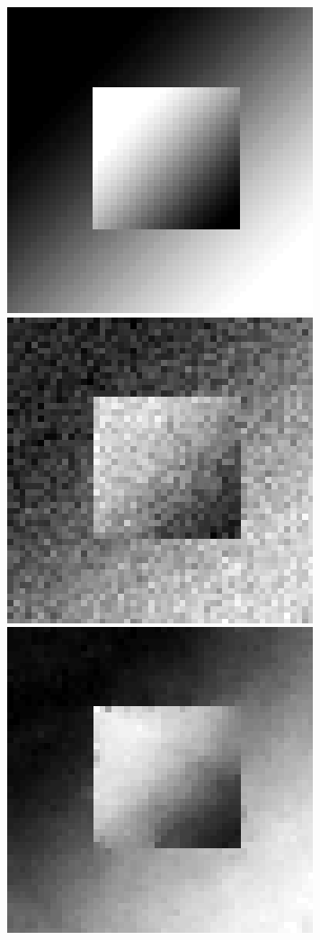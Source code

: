 \begin{figure}[!h]
\center
\includegraphics[scale=.28]{figures/epbp/denoisingExpleORIG}
\hspace*{.3cm}
\includegraphics[scale=.28]{figures/epbp/denoisingExpleINPUT}
\hspace*{.3cm}
\includegraphics[scale=.28]{figures/epbp/denoisingExpleRECO}

\end{figure}
